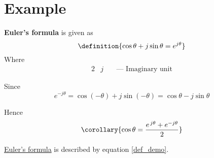 \section{Example}
\begin{term}
    \textbf{Euler's formula} is given as
    \begin{equation}
        \definition{\cos\theta + j\sin\theta = e^{j\theta}}
        \label{def_demo}
    \end{equation}
    Where
    \begin{alignat*}{2}
        &j\ &&\text{--- Imaginary unit}
    \end{alignat*}

    Since
    \[ e^{-j\theta} = \cos(-\theta) + j\sin(-\theta) = \cos\theta - j\sin\theta \]
    
    Hence
    \begin{equation}
        \corollary{\cos\theta = \frac{e^{\, j\theta} + e^{-j\theta}}{2}}
        \label{cor_demo}
    \end{equation}
\end{term}


\begin{example}
    \hyperlink{ref_demo}{Euler's formula} is described by equation \ref{def_demo}.
\end{example}


\begin{solution}
\end{solution}

